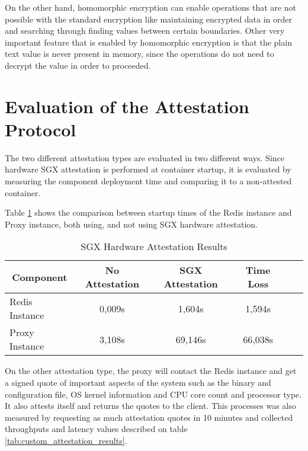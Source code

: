On the other hand, homomorphic encryption can enable operations that are not possible with the standard encryption like maintaining encrypted data in order and searching through finding values between certain boundaries. Other very important feature that is enabled by homomorphic encryption is that the plain text value is never present in memory, since the operations do not need to decrypt the value in order to proceeded.

\section{Evaluation of the Attestation Protocol}
\label{sec:evaluation_attestation_protocol}

The two different attestation types are evaluated in two different ways. Since hardware \gls{SGX} attestation is performed at container startup, it is evaluated by measuring the component deployment time and comparing it to a non-attested container.

Table \ref{tab:sgx_attestation_results} shows the comparison between startup times of the Redis instance and Proxy instance, both using, and not using \gls{SGX} hardware attestation.

\begin{table}[ht]
	\caption{SGX Hardware Attestation Results}
	\label{tab:sgx_attestation_results}
\centering
\begin{tabular}{lccccc}
	\toprule
	\multicolumn{1}{c}{\textbf{Component}} & \textbf{No Attestation} & \textbf{SGX Attestation} & \textbf{Time Loss} \\
	\midrule
		Redis Instance & 0,009s & 1,604s & 1,594s 	\\
		Proxy Instance & 3,108s & 69,146s & 66,038s 	\\
	\bottomrule
\end{tabular}
\end{table}

On the other attestation type, the proxy will contact the Redis instance and get a signed quote of important aspects of the system such as the binary and configuration file, \gls{OS} kernel information and \gls{CPU} core count and processor type. It also attests itself and returns the quotes to the client. This processes was also measured by requesting as much attestation quotes in 10 minutes and collected throughputs and latency values described on table \ref{tab:custom_attestation_results}.

